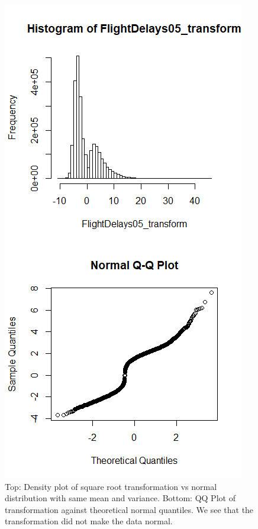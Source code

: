 \documentclass[12pt, a4paper, openany]{book}
\begin{document}

	 		\begin{figure}[h]
			\centering
	 		\includegraphics[width =.5 \textwidth]{../figures/shittysqrt}
	 		\caption{Top: Density plot of square root transformation vs normal distribution with same mean and variance. Bottom: QQ Plot of transformation against theoretical normal quantiles. We see that the transformation did not make the data normal.}
	 		\end{figure}
\end{document}
